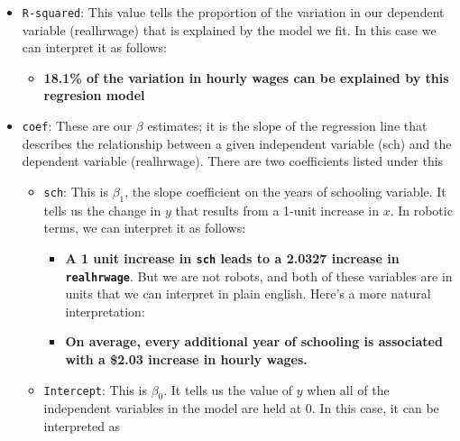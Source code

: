 \documentclass[
  letterpaper,
  DIV=11,
  numbers=noendperiod]{scrreprt}
\providecommand{\tightlist}{%
  \setlength{\itemsep}{0pt}\setlength{\parskip}{0pt}}\usepackage{longtable,booktabs,array}
\begin{document}
\begin{itemize}
\tightlist
\item
  \texttt{R-squared}: This value tells the proportion of the variation
  in our dependent variable (realhrwage) that is explained by the model
  we fit. In this case we can interpret it as follows:

  \begin{itemize}
  \tightlist
  \item
    \textbf{18.1\% of the variation in hourly wages can be explained by
    this regresion model}
  \end{itemize}
\item
  \texttt{coef}: These are our \(\beta\) estimates; it is the slope of
  the regression line that describes the relationship between a given
  independent variable (sch) and the dependent variable (realhrwage).
  There are two coefficients listed under this

  \begin{itemize}
  \tightlist
  \item
    \texttt{sch}: This is \(\beta_1\), the slope coefficient on the
    years of schooling variable. It tells us the change in \(y\) that
    results from a 1-unit increase in \(x\). In robotic terms, we can
    interpret it as follows:

    \begin{itemize}
    \tightlist
    \item
      \textbf{A 1 unit increase in \texttt{sch} leads to a 2.0327
      increase in \texttt{realhrwage}}. But we are not robots, and both
      of these variables are in units that we can interpret in plain
      english. Here's a more natural interpretation:
    \item
      \textbf{On average, every additional year of schooling is
      associated with a \$2.03 increase in hourly wages.}
    \end{itemize}
  \item
    \texttt{Intercept}: This is \(\beta_0\). It tells us the value of
    \(y\) when all of the independent variables in the model are held at
    0. In this case, it can be interpreted as


\end{itemize}
\end{itemize}
\end{document}
